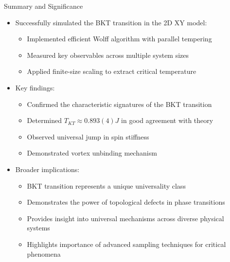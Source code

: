 \documentclass[11pt,aspectratio=169]{beamer}
\begin{document}
\begin{frame}{Summary and Significance}
    \begin{itemize}
        \item Successfully simulated the BKT transition in the 2D XY model:
        \begin{itemize}
            \item Implemented efficient Wolff algorithm with parallel tempering
            \item Measured key observables across multiple system sizes
            \item Applied finite-size scaling to extract critical temperature
        \end{itemize}
        \pause
        \item Key findings:
        \begin{itemize}
            \item Confirmed the characteristic signatures of the BKT transition
            \item Determined $T_{KT} \approx 0.893(4) J$ in good agreement with theory
            \item Observed universal jump in spin stiffness
            \item Demonstrated vortex unbinding mechanism
        \end{itemize}
        \pause
        \item Broader implications:
        \begin{itemize}
            \item BKT transition represents a unique universality class
            \item Demonstrates the power of topological defects in phase transitions
            \item Provides insight into universal mechanisms across diverse physical systems
            \item Highlights importance of advanced sampling techniques for critical phenomena
        \end{itemize}
    \end{itemize}
\end{frame}
\end{document}
